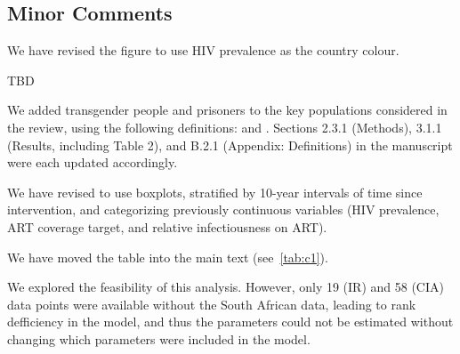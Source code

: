 \subsection{Minor Comments}
\begin{comment}
Figure 2: I would prefer HIV prevalence over PLHIV as the chloropleth.
\end{comment}
\begin{response}
We have revised the figure to use HIV prevalence as the country colour.
\end{response}
\begin{comment}
Do any studies address the age distribution of key populations? This would be useful to include.
\end{comment}
\begin{response}
TBD
\end{response}
\begin{comment}
Were transgender people or prisoners included in any studies?
\end{comment}
\begin{response}
We added transgender people and prisoners to the key populations considered in the review,
using the following definitions:
 and
.
Sections 2.3.1 (Methods), 3.1.1 (Results, including Table 2), and B.2.1 (Appendix: Definitions)
in the manuscript were each updated accordingly.
\end{response}
\begin{comment}
I find the bubble plots difficult to interpret. The bubbles are often similarly sized, I'm not sure the extra information adds to the results and crowds the plot. Perhaps grouped bar charts or grouped box plots would be easier to read - particularly for Figure 3.
\end{comment}
\begin{response}
We have revised to use boxplots,
stratified by 10-year intervals of time since intervention,
and categorizing previously continuous variables
(HIV prevalence, ART coverage target, and relative infectiousness on ART).
\end{response}
\begin{comment}
Consider inserting Table C.1 into the main text
\end{comment}
\begin{response}
We have moved the table into the main text (see~\ref{tab:c1}).
\end{response}
\begin{comment}
Consider a sensitivity analysis of the main findings without South African data
\end{comment}
\begin{response}
We explored the feasibility of this analysis.
However, only 19 (IR) and 58 (CIA) data points were available without the South African data,
leading to rank defficiency in the model,
and thus the parameters could not be estimated
without changing which parameters were included in the model.
\end{response}